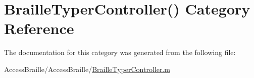 \hypertarget{category_braille_typer_controller_07_08}{\section{Braille\-Typer\-Controller() Category Reference}
\label{category_braille_typer_controller_07_08}
}


The documentation for this category was generated from the following file\-:\begin{DoxyCompactItemize}
\item 
Access\-Braille/\-Access\-Braille/\hyperlink{_braille_typer_controller_8m}{Braille\-Typer\-Controller.\-m}\end{DoxyCompactItemize}
